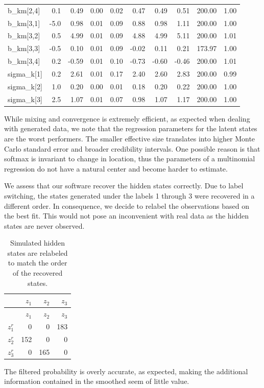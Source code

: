 \documentclass[]{article}
\begin{document}
{{{\begin{longtable}[]{@{}lrrrrrrrrr@{}}
b\_km{[}2,4{]} & 0.1 & 0.49 & 0.00 & 0.02 & 0.47 & 0.49 & 0.51 & 200.00
& 1.00\tabularnewline
b\_km{[}3,1{]} & -5.0 & 0.98 & 0.01 & 0.09 & 0.88 & 0.98 & 1.11 & 200.00
& 1.00\tabularnewline
b\_km{[}3,2{]} & 0.5 & 4.99 & 0.01 & 0.09 & 4.88 & 4.99 & 5.11 & 200.00
& 1.01\tabularnewline
b\_km{[}3,3{]} & -0.5 & 0.10 & 0.01 & 0.09 & -0.02 & 0.11 & 0.21 &
173.97 & 1.00\tabularnewline
b\_km{[}3,4{]} & 0.2 & -0.59 & 0.01 & 0.10 & -0.73 & -0.60 & -0.46 &
200.00 & 1.01\tabularnewline
sigma\_k{[}1{]} & 0.2 & 2.61 & 0.01 & 0.17 & 2.40 & 2.60 & 2.83 & 200.00
& 0.99\tabularnewline
sigma\_k{[}2{]} & 1.0 & 0.20 & 0.00 & 0.01 & 0.18 & 0.20 & 0.22 & 200.00
& 1.00\tabularnewline
sigma\_k{[}3{]} & 2.5 & 1.07 & 0.01 & 0.07 & 0.98 & 1.07 & 1.17 & 200.00
& 1.00\tabularnewline
\bottomrule
\end{longtable}

While mixing and convergence is extremely efficient, as expected when
dealing with generated data, we note that the regression parameters for
the latent states are the worst performers. The smaller effective size
translates into higher Monte Carlo standard error and broader
credibility intervals. One possible reason is that softmax is invariant
to change in location, thus the parameters of a multinomial regression
do not have a natural center and become harder to estimate.

We assess that our software recover the hidden states correctly. Due to
label switching, the states generated under the labels 1 through 3 were
recovered in a different order. In consequence, we decide to relabel the
observations based on the best fit. This would not pose an inconvenient
with real data as the hidden states are never observed.

\begin{longtable}[]{@{}lrrr@{}}
\caption{Simulated hidden states are relabeled to match the order of the
recovered states.}\tabularnewline
\toprule
& \(z_1\) & \(z_2\) & \(z_3\)\tabularnewline
\midrule
\endfirsthead
\toprule
& \(z_1\) & \(z_2\) & \(z_3\)\tabularnewline
\midrule
\endhead
\(z^r_1\) & 0 & 0 & 183\tabularnewline
\(z^r_2\) & 152 & 0 & 0\tabularnewline
\(z^r_3\) & 0 & 165 & 0\tabularnewline
\bottomrule
\end{longtable}

The filtered probability is overly accurate, as expected, making the
additional information contained in the smoothed seem of little value.

}}}
\end{document}
